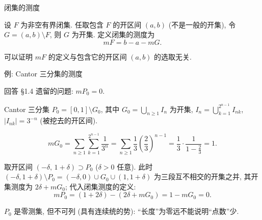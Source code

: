 
\begin{frame}{闭集的测度}

\begin{Def}[闭集的测度]
设 $F$ 为非空有界闭集. 任取包含 $F$ 的\alert{开区间} $(a,b)$ (不是一般的开集), 令 $G = (a,b) \setminus F$, 则 $G$ 为开集. 定义\alert{闭集的测度}为
\[
m F = b - a - m G.
\]
\end{Def}

\pause

\begin{remark}
可以证明 $m F$ 的定义与包含它的开区间 $(a,b)$ 的选取无关.
\end{remark}

\end{frame}


\begin{frame}{例: Cantor 三分集的测度}

回答 §1.4 遗留的问题: $m P_0 = 0$.

\pause

Cantor 三分集 $P_0 = [0,1] \setminus G_0$, 其中 $G_0 = \bigcup_{n \geqslant 1} I_n$ 为开集,
$I_n = \bigcup_{k=1}^{2^{n-1}} I_{nk}$, $|I_{nk}| = 3^{-n}$ (被挖去的开区间).

\[
m G_0 = \sum_{n \geqslant 1} \sum_{k=1}^{2^{n-1}} \frac{1}{3^n}
= \sum_{n \geqslant 1} \frac{1}{3} \left(\frac{2}{3}\right)^{n-1}
= \frac{1}{3} \cdot \frac{1}{1 - \frac{2}{3}} = 1.
\]

\pause

取开区间 $(-\delta,\, 1+\delta) \supset P_0$ ($\delta > 0$ 任意). 此时
$(-\delta, 1+\delta) \setminus P_0 = (-\delta, 0) \cup G_0 \cup (1, 1+\delta)$
为三段互不相交的开集之并, 其开集测度为 $2\delta + m G_0$; 代入闭集测度的定义:
\[
m P_0 = (1 + 2\delta) - (2\delta + m G_0) = 1 - m G_0 = 0.
\]

\begin{attnblock}
$P_0$ 是\alert{零测集}, 但不可列 (具有连续统的势): ``长度''为零远不能说明``点数''少.
\end{attnblock}

\end{frame}


